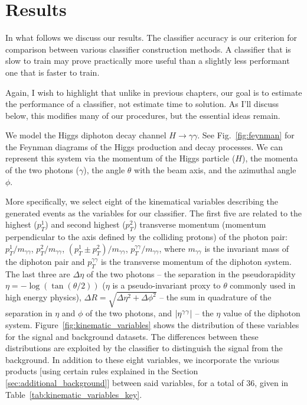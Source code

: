 \section{Results}
In what follows we  discuss our results.
The classifier accuracy is our criterion for comparison between various classifier construction methods.  A classifier that is slow to train may prove practically more useful than a slightly less performant one that is faster to train.

Again, I wish to highlight that unlike in previous chapters, our goal is to estimate the performance of a classifier, not estimate time to solution. As I'll discuss below, this modifies many of our procedures, but the essential ideas remain.

We model the Higgs diphoton decay channel $H\rightarrow\gamma\gamma$. See Fig.~\ref{fig:feynman} for the Feynman diagrams of the Higgs production and decay processes. We can represent this system via the momentum of the Higgs particle ($H$), the momenta of the two photons ($\gamma$), the angle $\theta$ with the beam axis, and the azimuthal angle $\phi$.

More specifically, we select eight of the kinematical variables describing the generated events as the variables for our classifier. The first five are related to the highest ($p_T^1$) and second highest ($p_T^2$) transverse momentum (momentum perpendicular to the axis defined by the colliding protons) of the photon pair:
 $p_T^1/m_{\gamma\gamma}$, $p_T^2/m_{\gamma\gamma}$, $(p_T^1\pm p_T^2)/m_{\gamma\gamma}$, $p_T^{\gamma\gamma}/m_{\gamma\gamma}$, where $m_{\gamma\gamma}$ is the invariant mass of the diphoton pair and $p_T^{\gamma\gamma}$ is the transverse momentum of the diphoton system. The last three are $\Delta\eta$ of the two photons -- the separation in the pseudorapidity  $\eta = -\log(\tan(\theta/2))$ ($\eta$ is a pseudo-invariant proxy to $\theta$ commonly used in high energy physics), $\Delta R = \sqrt{\Delta\eta^2+\Delta\phi^2}$ -- the sum in quadrature of the separation in $\eta$ and $\phi$ of the two photons, and $\abs{\eta^{\gamma\gamma}}$ -- the $\eta$ value of the diphoton system.
Figure~\ref{fig:kinematic_variables} shows the distribution of these variables for the signal and background datasets. The differences between these distributions are exploited by the classifier  to distinguish the signal from the background. In addition to these eight variables, we incorporate the various products [using certain rules explained in the Section \ref{sec:additional_background}] between said variables, for a total of $36$, given in Table~\ref{tab:kinematic_variables_key}.


